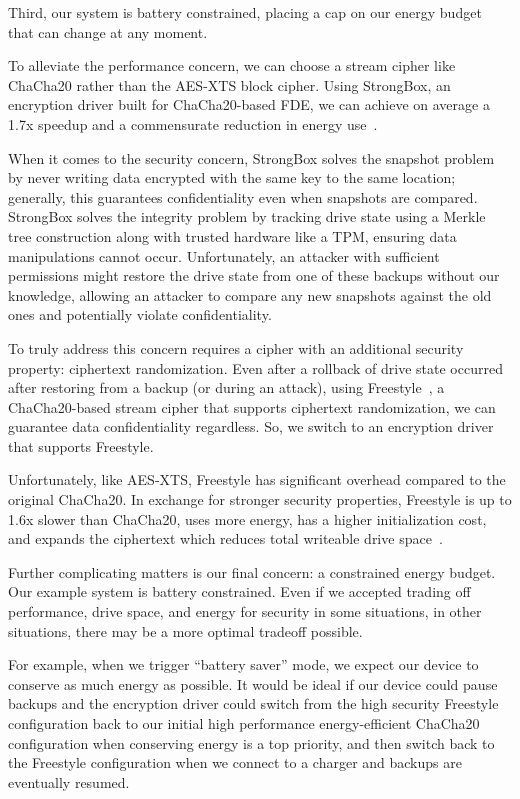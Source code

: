 Third, our system is battery constrained, placing a cap on our energy budget
that can change at any moment.

To alleviate the performance concern, we can choose a stream cipher like
ChaCha20 rather than the AES-XTS block cipher. Using StrongBox, an encryption
driver built for ChaCha20-based FDE, we can achieve on average a 1.7x speedup
and a commensurate reduction in energy use~\cite{StrongBox}.

When it comes to the security concern, StrongBox solves the snapshot problem by
never writing data encrypted with the same key to the same location; generally,
this guarantees confidentiality even when snapshots are compared. StrongBox
solves the integrity problem by tracking drive state using a Merkle tree
construction along with trusted hardware like a TPM, ensuring data manipulations
cannot occur. Unfortunately, an attacker with sufficient permissions might
restore the drive state from one of these backups without our knowledge,
allowing an attacker to compare any new snapshots against the old ones and
potentially violate confidentiality.

To truly address this concern requires a cipher with an additional security
property: ciphertext randomization. Even after a rollback of drive state
occurred after restoring from a backup (or during an attack), using
Freestyle~\cite{Freestyle}, a ChaCha20-based stream cipher that supports
ciphertext randomization, we can guarantee data confidentiality regardless. So,
we switch to an encryption driver that supports Freestyle.

Unfortunately, like AES-XTS, Freestyle has significant overhead compared to the
original ChaCha20. In exchange for stronger security properties, Freestyle is up
to 1.6x slower than ChaCha20, uses more energy, has a higher initialization
cost, and expands the ciphertext which reduces total writeable drive
space~\cite{Freestyle}.

Further complicating matters is our final concern: a constrained energy budget.
Our example system is battery constrained. Even if we accepted trading off
performance, drive space, and energy for security in some situations, in other
situations, there may be a more optimal tradeoff possible.

For example, when we
trigger ``battery saver'' mode, we expect our device to conserve as much energy
as possible. It would be ideal if our device could pause backups and the encryption driver
could switch from the high security Freestyle configuration back to our initial high
performance energy-efficient ChaCha20 configuration when conserving energy is a
top priority, and then switch back to the Freestyle configuration when we connect to a charger and
backups are eventually resumed.

